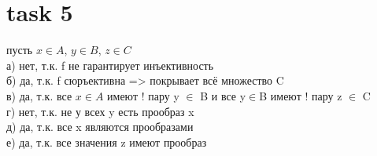 \documentclass{article}
\begin{document}
\section{task 5}
пусть $x \in A$, $y \in B$, $z \in C$ \\
а) нет, т.к. f не гарантирует инъективность \\
б) да, т.к. f сюръективна => покрывает всё множество C \\
в) да, т.к. все $x \in A$ имеют ! пару y $\in$ B и все y$\in$B имеют ! пару z $\in$ C \\
г) нет, т.к. не у всех y есть прообраз x\\
д) да, т.к. все x являются прообразами \\
е) да, т.к. все значения z имеют прообраз \\
\end{document}
